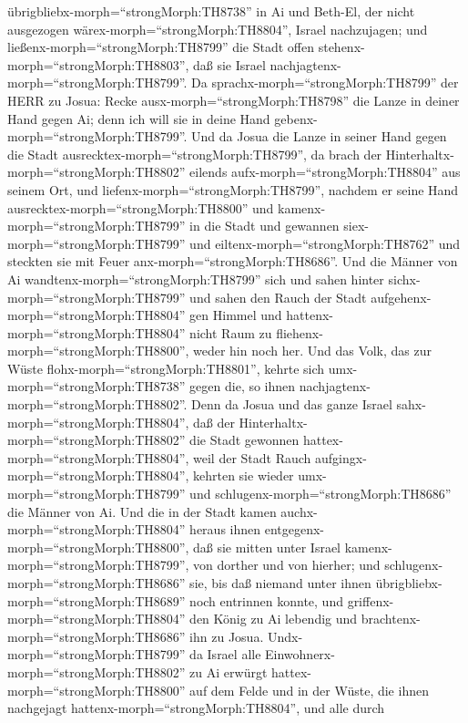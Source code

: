 übrigbliebx-morph=``strongMorph:TH8738'' in Ai und Beth-El, der nicht
ausgezogen wärex-morph=``strongMorph:TH8804'', Israel nachzujagen; und
ließenx-morph=``strongMorph:TH8799'' die Stadt offen
stehenx-morph=``strongMorph:TH8803'', daß sie Israel
nachjagtenx-morph=``strongMorph:TH8799''.  Da
sprachx-morph=``strongMorph:TH8799'' der HERR zu Josua: Recke
ausx-morph=``strongMorph:TH8798'' die Lanze in deiner Hand gegen Ai;
denn ich will sie in deine Hand gebenx-morph=``strongMorph:TH8799''. Und
da Josua die Lanze in seiner Hand gegen die Stadt
ausrecktex-morph=``strongMorph:TH8799'',  da brach der
Hinterhaltx-morph=``strongMorph:TH8802'' eilends
aufx-morph=``strongMorph:TH8804'' aus seinem Ort, und
liefenx-morph=``strongMorph:TH8799'', nachdem er seine Hand
ausrecktex-morph=``strongMorph:TH8800'' und
kamenx-morph=``strongMorph:TH8799'' in die Stadt und gewannen
siex-morph=``strongMorph:TH8799'' und
eiltenx-morph=``strongMorph:TH8762'' und steckten sie mit Feuer
anx-morph=``strongMorph:TH8686''.  Und die Männer von Ai
wandtenx-morph=``strongMorph:TH8799'' sich und sahen hinter
sichx-morph=``strongMorph:TH8799'' und sahen den Rauch der Stadt
aufgehenx-morph=``strongMorph:TH8804'' gen Himmel und
hattenx-morph=``strongMorph:TH8804'' nicht Raum zu
fliehenx-morph=``strongMorph:TH8800'', weder hin noch her. Und das Volk,
das zur Wüste flohx-morph=``strongMorph:TH8801'', kehrte sich
umx-morph=``strongMorph:TH8738'' gegen die, so ihnen
nachjagtenx-morph=``strongMorph:TH8802''.  Denn da Josua
und das ganze Israel sahx-morph=``strongMorph:TH8804'', daß der
Hinterhaltx-morph=``strongMorph:TH8802'' die Stadt gewonnen
hattex-morph=``strongMorph:TH8804'', weil der Stadt Rauch
aufgingx-morph=``strongMorph:TH8804'', kehrten sie wieder
umx-morph=``strongMorph:TH8799'' und
schlugenx-morph=``strongMorph:TH8686'' die Männer von Ai. 
Und die in der Stadt kamen auchx-morph=``strongMorph:TH8804'' heraus
ihnen entgegenx-morph=``strongMorph:TH8800'', daß sie mitten unter
Israel kamenx-morph=``strongMorph:TH8799'', von dorther und von hierher;
und schlugenx-morph=``strongMorph:TH8686'' sie, bis daß niemand unter
ihnen übrigbliebx-morph=``strongMorph:TH8689'' noch entrinnen konnte,
 und griffenx-morph=``strongMorph:TH8804'' den König zu Ai
lebendig und brachtenx-morph=``strongMorph:TH8686'' ihn zu Josua.
 Undx-morph=``strongMorph:TH8799'' da Israel alle
Einwohnerx-morph=``strongMorph:TH8802'' zu Ai erwürgt
hattex-morph=``strongMorph:TH8800'' auf dem Felde und in der Wüste, die
ihnen nachgejagt hattenx-morph=``strongMorph:TH8804'', und alle durch
